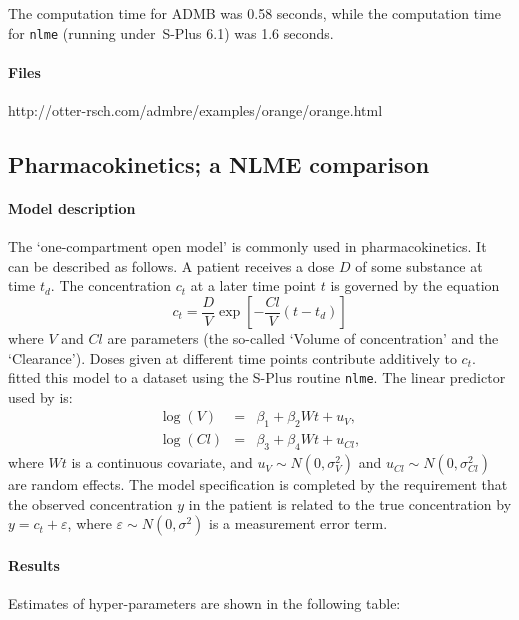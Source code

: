\documentclass[12pt,letter,reqno]{book}
\begin{document}
The computation time for ADMB was 0.58 seconds, while the computation time
for \texttt{nlme} (running under\ S-Plus 6.1) was 1.6 seconds.

\paragraph{Files} http://otter-rsch.com/admbre/examples/orange/orange.html

\newpage

\subsection{Pharmacokinetics; a NLME comparison}
\label{sec:pheno}

\paragraph{Model description}
The `one-compartment open model' is commonly used in pharmacokinetics. It
can be described as follows. A patient receives a dose $D$ of some substance
at time $t_{d}$. The concentration $c_t$ at a later time point $t$ is
governed by the equation%
\[
c_t=\frac{D}{V}\exp \left[ -\frac{Cl}{V}(t-t_{d})\right] 
\]%
where $V$ and $Cl$ are parameters (the so-called `Volume of concentration'
and the `Clearance'). Doses given at different time points contribute
additively to $c_t$.  fitted this
model to a dataset using the S-Plus routine \texttt{nlme}. The linear
predictor used by  is:%
\begin{eqnarray*}
\log \left( V\right) &=&\beta_{1}+\beta_{2}Wt+u_{V}, \\
\log \left( Cl\right) &=&\beta_{3}+\beta_{4}Wt+u_{Cl},
\end{eqnarray*}%
where $Wt$ is a continuous covariate, and $u_{V}\sim N(0,\sigma_{V}^{2})$
and $u_{Cl}\sim N(0,\sigma_{Cl}^{2})$ are random effects. The model
specification is completed by the requirement that the observed
concentration $y$ in the patient is related to the true concentration by $%
y=c_t+\varepsilon $, where $\varepsilon \sim N(0,\sigma ^{2})$ is a
measurement error term.

\paragraph{Results}

Estimates of hyper-parameters are shown in the following table:
\end{document}
